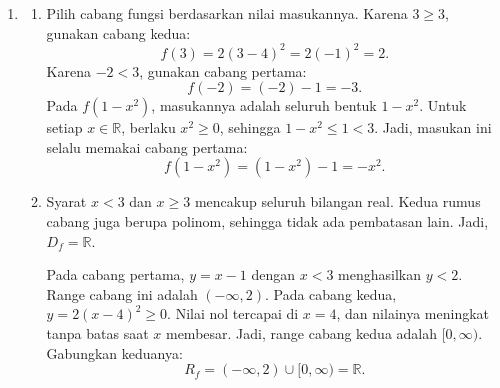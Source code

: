 \documentclass[10pt,letterpaper]{article}
\newcommand{\R}{\mathbb{R}}
\begin{document}
\begin{enumerate}
\begin{enumerate}
          \item Kedua titik menjadi ujung diameter lingkaran.
                Pusat lingkaran adalah titik tengah diameter:
                \[
                  C=\left(\frac{1+7}{2},\frac{3+11}{2}\right)=\boxed{(4,7)}.
                \]
                Panjang diameter adalah $10$, sehingga jari-jarinya $r=10/2=5$.
                Gunakan bentuk baku $(x-h)^2+(y-k)^2=r^2$:
                \[
                  \boxed{(x-4)^2+(y-7)^2=25}.
                \]
                Kedua ujung diameter memang berada pada lingkaran.
                Misalnya, untuk $A$, diperoleh $(1-4)^2+(3-7)^2=9+16=25$.
        \end{enumerate}

        \newpage

  \item \begin{enumerate}
          \item Pilih cabang fungsi berdasarkan nilai masukannya.
                Karena $3\ge3$, gunakan cabang kedua:
                \[
                  f(3)=2(3-4)^2=2(-1)^2=\boxed{2}.
                \]
                Karena $-2<3$, gunakan cabang pertama:
                \[
                  f(-2)=(-2)-1=\boxed{-3}.
                \]
                Pada $f(1-x^2)$, masukannya adalah seluruh bentuk $1-x^2$.
                Untuk setiap $x\in\R$, berlaku $x^2\ge0$, sehingga $1-x^2\le1<3$.
                Jadi, masukan ini selalu memakai cabang pertama:
                \[
                  f(1-x^2)=(1-x^2)-1=\boxed{-x^2}.
                \]

          \item Syarat $x<3$ dan $x\ge3$ mencakup seluruh bilangan real.
                Kedua rumus cabang juga berupa polinom, sehingga tidak ada pembatasan lain.
                Jadi, $\boxed{D_f=\R}$.

                Pada cabang pertama, $y=x-1$ dengan $x<3$ menghasilkan $y<2$.
                Range cabang ini adalah $(-\infty,2)$.
                Pada cabang kedua, $y=2(x-4)^2\ge0$.
                Nilai nol tercapai di $x=4$, dan nilainya meningkat tanpa batas saat $x$ membesar.
                Jadi, range cabang kedua adalah $[0,\infty)$.
                Gabungkan keduanya:
                \[
                  \boxed{R_f=(-\infty,2)\cup[0,\infty)=\R}.
                \]


\end{enumerate}
\end{enumerate}
\end{document}
